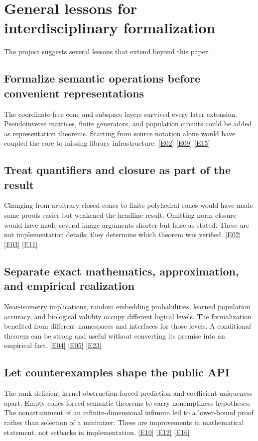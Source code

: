 \documentclass[11pt,a4paper]{article}
\newcommand{\ev}[1]{%
  \hyperref[ev:#1]{\textcolor{ReportBlue}{\textsf{\scriptsize[#1]}}}}
\begin{document}
\section{General lessons for interdisciplinary formalization}
\label{sec:lessons}

The project suggests several lessons that extend beyond this paper.

\subsection{Formalize semantic operations before convenient representations}

The coordinate-free cone and subspace layers survived every later extension.
Pseudoinverse matrices, finite generators, and population circuits could be added as
representation theorems. Starting from source notation alone would have coupled the
core to missing library infrastructure. \ev{E02}\ev{E09}\ev{E15}

\subsection{Treat quantifiers and closure as part of the result}

Changing from arbitrary closed cones to finite polyhedral cones would have made some
proofs easier but weakened the headline result. Omitting norm closure would have made
several image arguments shorter but false as stated. These are not implementation
details; they determine which theorem was verified. \ev{E02}\ev{E03}\ev{E11}

\subsection{Separate exact mathematics, approximation, and empirical realization}

Near-isometry implications, random embedding probabilities, learned population
accuracy, and biological validity occupy different logical levels. The formalization
benefited from different namespaces and interfaces for those levels. A conditional
theorem can be strong and useful without converting its premise into an empirical
fact. \ev{E04}\ev{E05}\ev{E23}

\subsection{Let counterexamples shape the public API}

The rank-deficient kernel obstruction forced prediction and coefficient uniqueness
apart. Empty cones forced semantic theorems to carry nonemptiness hypotheses. The
nonattainment of an infinite-dimensional infimum led to a lower-bound proof rather
than selection of a minimizer. These are improvements in mathematical statement,
not setbacks in implementation. \ev{E10}\ev{E12}\ev{E16}
\end{document}

